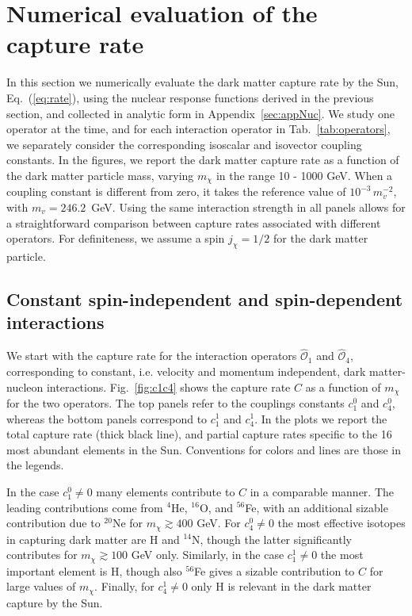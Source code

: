 \documentclass[11pt,a4paper]{article}
\begin{document}
\section{Numerical evaluation of the capture rate}
\label{sec:rate}
In this section we numerically evaluate the dark matter capture rate by the Sun, Eq.~(\ref{eq:rate}), using the nuclear response functions derived in the previous section, and collected in analytic form in Appendix~\ref{sec:appNuc}. We study one operator at the time, and for each interaction operator in Tab.~\ref{tab:operators}, we separately consider the corresponding isoscalar and isovector coupling constants. In the figures, we report the dark matter capture rate as a function of the dark matter particle mass, varying $m_\chi$ in the range 10 - 1000 GeV. When a coupling constant is different from zero, it takes the reference value of $10^{-3}\,m_v^{-2}$, with $m_v=246.2$~GeV. Using the same interaction strength in all panels allows for a straightforward comparison between capture rates associated with different operators. For definiteness, we assume a spin $j_\chi=1/2$ for the dark matter particle.

\subsection{Constant spin-independent and spin-dependent interactions}
We start with the capture rate for the interaction operators $\hat{\mathcal{O}}_1$ and $\hat{\mathcal{O}}_4$, corresponding to constant, i.e. velocity and momentum independent, dark matter-nucleon interactions. 
Fig.~\ref{fig:c1c4} shows the capture rate $C$ as a function of $m_\chi$ for the two operators. The top panels refer to the couplings constants $c_1^0$ and $c_4^0$, whereas the bottom panels correspond to $c_1^1$ and $c_4^1$. In the plots we report the total capture rate (thick black line), and partial capture rates specific to the 16 most abundant elements in the Sun. Conventions for colors and lines are those in the legends.

In the case $c_1^0\neq0$ many elements contribute to $C$ in a comparable manner. The leading contributions come from $^{4}$He, $^{16}$O, and $^{56}$Fe, with an additional sizable contribution due to $^{20}$Ne for $m_\chi\gtrsim 400$ GeV. For $c_4^0\neq0$ the most effective isotopes in capturing dark matter are H and $^{14}$N, though the latter significantly contributes for $m_\chi\gtrsim100$ GeV only. Similarly, in the case $c_1^1\neq0$ the most important element is H, though also $^{56}$Fe gives a sizable contribution to $C$ for large values of $m_\chi$. Finally, for $c_4^1\neq0$ only H is relevant in the dark matter capture by the Sun.
\end{document}
